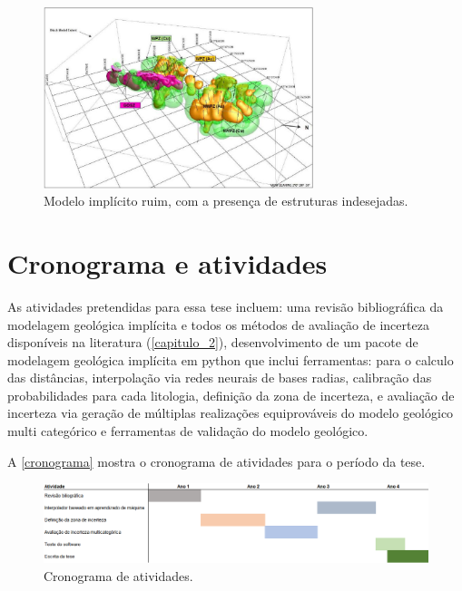 \begin{figure}[!ht]
	\caption{\label{blob}Modelo implícito ruim, com a presença de estruturas indesejadas.}
	\begin{center}
		\includegraphics[width=0.7\textwidth]{capitulo_3/blob.jpg}
	\end{center}
\end{figure}

\section{Cronograma e atividades}

As atividades pretendidas para essa tese incluem: uma revisão bibliográfica da modelagem geológica implícita e todos os métodos de avaliação de incerteza disponíveis na literatura (\autoref{capitulo_2}), desenvolvimento de um pacote de modelagem geológica implícita em python que inclui ferramentas: para o calculo das distâncias, interpolação via redes neurais de bases radias, calibração das probabilidades para cada litologia, definição da zona de incerteza, e avaliação de incerteza via geração de múltiplas realizações equiprováveis do modelo geológico multi categórico e ferramentas de validação do modelo geológico.

A \autoref{cronograma} mostra o cronograma de atividades para o período da tese.

\begin{figure}[!ht]
	\caption{\label{cronograma}Cronograma de atividades.}
	\begin{center}
		\includegraphics[width=\textwidth]{capitulo_3/cronograma_novo.png}
	\end{center}
\end{figure}